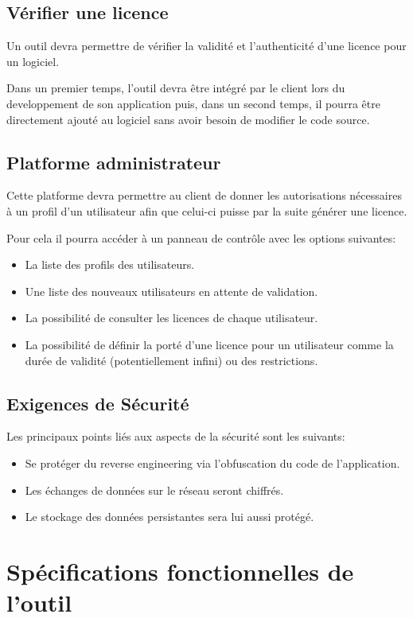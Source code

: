 \section{Vérifier une licence}
Un outil devra permettre de vérifier la validité et l'authenticité d'une licence pour un logiciel. \newline

Dans un premier temps, l'outil devra être intégré par le client lors du developpement de son application puis, dans un second temps, il pourra être directement ajouté au logiciel sans avoir besoin de modifier le code source.

\section{Platforme administrateur}
Cette platforme devra permettre au client de donner les autorisations nécessaires à un profil d'un utilisateur afin que celui-ci puisse par la suite générer une licence.

Pour cela il pourra accéder à un panneau de contrôle avec les options suivantes:

\begin{itemize}
	\item La liste des profils des utilisateurs.
	\item Une liste des nouveaux utilisateurs en attente de validation.
	\item La possibilité de consulter les licences de chaque utilisateur.
	\item La possibilité de définir la porté d'une licence pour un utilisateur comme la durée de validité (potentiellement infini) ou des restrictions.
\end{itemize}
\newpage

\section{Exigences de Sécurité}
Les principaux points liés aux aspects de la sécurité sont les suivants:
\begin{itemize}
	\item Se protéger du reverse engineering via l'obfuscation du code de l'application.
	\item Les échanges de données sur le réseau seront chiffrés.
	\item Le stockage des données persistantes sera lui aussi protégé.
\end{itemize}   

\chapter{Spécifications fonctionnelles de l'outil}


